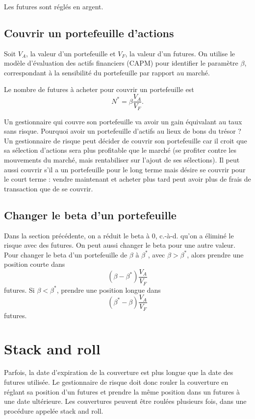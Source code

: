 Les futures sont réglés en argent. 

\subsection{Couvrir un portefeuille d'actions}

Soit $V_A$, la valeur d'un portefeuille et $V_F$, la valeur d'un futures. On utilise le modèle d'évaluation des actifs financiers (CAPM) pour identifier le paramètre $\beta$, correspondant à la sensibilité du portefeuille par rapport au marché. 

Le nombre de futures à acheter pour couvrir un portefeuille est 
$$N^* = \beta \frac{V_A}{V_F}.$$

Un gestionnaire qui couvre son portefeuille va avoir un gain équivalant au taux sans risque. Pourquoi avoir un portefeuille d'actifs au lieux de bons du trésor ? Un gestionnaire de risque peut décider de couvrir son portefeuille car il croit que sa sélection d'actions sera plus profitable que le marché (se profiter contre les mouvements du marché, mais rentabiliser sur l'ajout de ses sélections). Il peut aussi couvrir s'il a un portefeuille pour le long terme mais désire se couvrir pour le court terme : vendre maintenant et acheter plus tard peut avoir plus de frais de transaction que de se couvrir. 

\subsection{Changer le beta d'un portefeuille}

Dans la section précédente, on a réduit le beta à 0, c.-à-d. qu'on a éliminé le risque avec des futures. On peut aussi changer le beta pour une autre valeur. Pour changer le beta d'un portefeuille de $\beta$ à $\beta^*$, avec $\beta > \beta^*$, alors prendre une position courte dans 
$$(\beta - \beta^*) \frac{V_A}{V_F}$$
futures. Si $\beta < \beta^*$, prendre une position longue dans 
$$(\beta^* - \beta) \frac{V_A}{V_F}$$
futures. 

\section{Stack and roll}

Parfois, la date d'expiration de la couverture est plus longue que la date des futures utilisée. Le gestionnaire de risque doit donc rouler la couverture en réglant sa position d'un futures et prendre la même position dans un futures à une date ultérieure. Les couvertures peuvent être roulées plusieurs fois, dans une procédure appelée stack and roll. 

